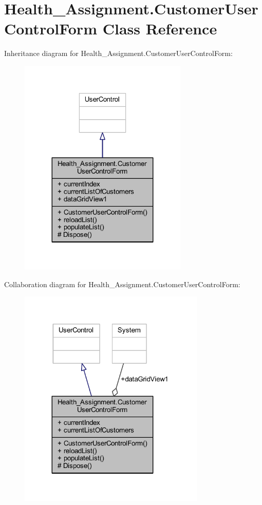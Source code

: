 \hypertarget{class_health___assignment_1_1_customer_user_control_form}{}\section{Health\+\_\+\+Assignment.\+Customer\+User\+Control\+Form Class Reference}
\label{class_health___assignment_1_1_customer_user_control_form}


Inheritance diagram for Health\+\_\+\+Assignment.\+Customer\+User\+Control\+Form\+:\nopagebreak
\begin{figure}[H]
\begin{center}
\leavevmode
\includegraphics[width=227pt]{class_health___assignment_1_1_customer_user_control_form__inherit__graph}
\end{center}
\end{figure}


Collaboration diagram for Health\+\_\+\+Assignment.\+Customer\+User\+Control\+Form\+:\nopagebreak
\begin{figure}[H]
\begin{center}
\leavevmode
\includegraphics[width=251pt]{class_health___assignment_1_1_customer_user_control_form__coll__graph}
\end{center}
\end{figure}
